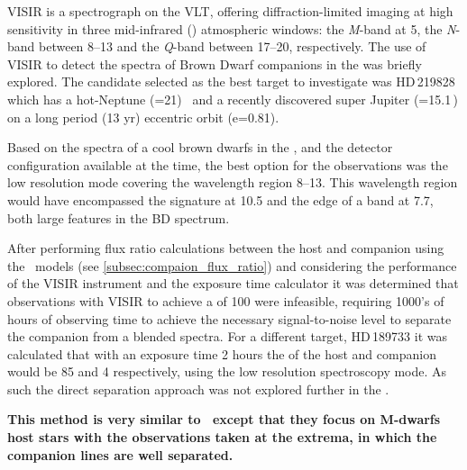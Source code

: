 {VISIR} is a \mir{} spectrograph on the {VLT}, offering diffraction-limited imaging at high sensitivity in three mid-infrared (\mir) atmospheric windows: the \emph{M}-band at 5\um{}, the \emph{N}-band between 8--13\um{} and the \emph{Q}-band between 17--20\um{}, respectively.
The use of {VISIR} to detect the spectra of Brown Dwarf companions in the {\mir{}} was briefly explored.
The candidate selected as the best target to investigate was {HD\,219828} which has a hot-Neptune (\Mtwosini{}=21\Mearth)~\citep{melo_new_2007} and a recently discovered super Jupiter (\Mtwosini{}=15.1\,\Mjup) on a long period (13 yr) eccentric orbit (e=0.81)\citep{santos_extreme_2016}.

Based on the spectra of a cool brown dwarfs in the \mir{}, and the detector configuration available at the time, the best option for the observations was the low resolution mode covering the wavelength region 8--13\um{}.
This wavelength region would have encompassed the  signature at 10.5\um{} and the edge of a  band at 7.7\um{}, both large features in the {BD} \mir{} spectrum.

After performing flux ratio calculations between the host and companion using the~\citet{baraffe_evolutionary_2003} models (see \cref{subsec:compaion_flux_ratio}) and considering the performance of the {VISIR} instrument and the exposure time calculator it was determined that observations with {VISIR} to achieve a \snr{} of 100 were infeasible, requiring 1000's of hours of observing time to achieve the necessary signal-to-noise level to separate the companion from a blended spectra.
For a different target, {HD\,189733} it was calculated that with an exposure time 2 hours the \snr{} of the host and companion would be 85 and 4 respectively, using the low resolution spectroscopy mode.
As such the direct separation approach was not explored further in the \mir{}.

\textbf{This method is very similar to~\citet{kostogryz_spectral_2013} except that they focus on M-dwarfs host stars with the observations taken at the extrema, in which the companion lines are well separated.
}
